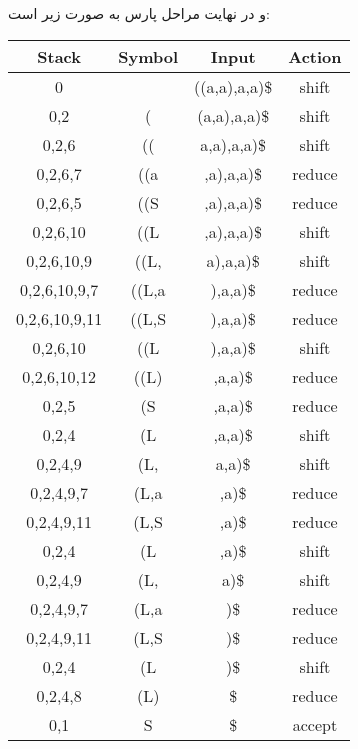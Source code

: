 و در نهایت مراحل پارس به صورت زیر است:

\begin{center}
\begin{latin}
\begin{tabular}{|c|c|c|c|}
\hline
Stack         & Symbol & Input         & Action \\ \hline
0             &        & ((a,a),a,a)\$ & shift  \\ \hline
0,2           & (      & (a,a),a,a)\$  & shift  \\ \hline
0,2,6         & ((     & a,a),a,a)\$   & shift  \\ \hline
0,2,6,7       & ((a    & ,a),a,a)\$    & reduce \\ \hline
0,2,6,5       & ((S    & ,a),a,a)\$    & reduce \\ \hline
0,2,6,10      & ((L    & ,a),a,a)\$    & shift  \\ \hline
0,2,6,10,9    & ((L,   & a),a,a)\$     & shift  \\ \hline
0,2,6,10,9,7  & ((L,a  & ),a,a)\$      & reduce \\ \hline
0,2,6,10,9,11 & ((L,S  & ),a,a)\$      & reduce \\ \hline
0,2,6,10      & ((L    & ),a,a)\$      & shift  \\ \hline
0,2,6,10,12   & ((L)   & ,a,a)\$       & reduce \\ \hline
0,2,5         & (S     & ,a,a)\$       & reduce \\ \hline
0,2,4         & (L     & ,a,a)\$       & shift  \\ \hline
0,2,4,9       & (L,    & a,a)\$        & shift  \\ \hline
0,2,4,9,7     & (L,a   & ,a)\$         & reduce \\ \hline
0,2,4,9,11    & (L,S   & ,a)\$         & reduce \\ \hline
0,2,4         & (L     & ,a)\$         & shift  \\ \hline
0,2,4,9       & (L,    & a)\$          & shift  \\ \hline
0,2,4,9,7     & (L,a   & )\$           & reduce \\ \hline
0,2,4,9,11    & (L,S   & )\$           & reduce \\ \hline
0,2,4         & (L     & )\$           & shift  \\ \hline
0,2,4,8       & (L)    & \$            & reduce \\ \hline
0,1           & S      & \$            & accept \\ \hline
\end{tabular}
\end{latin}
\end{center}
